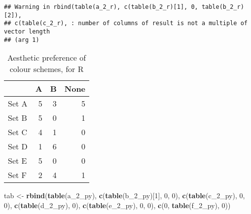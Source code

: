 \documentclass[
]{article}
\newenvironment{Shaded}{\begin{snugshade}}{\end{snugshade}}
\newcommand{\DataTypeTok}[1]{\textcolor[rgb]{0.13,0.29,0.53}{#1}}
\newcommand{\DecValTok}[1]{\textcolor[rgb]{0.00,0.00,0.81}{#1}}
\newcommand{\KeywordTok}[1]{\textcolor[rgb]{0.13,0.29,0.53}{\textbf{#1}}}
\newcommand{\NormalTok}[1]{#1}
\newcommand{\OperatorTok}[1]{\textcolor[rgb]{0.81,0.36,0.00}{\textbf{#1}}}
\newcommand{\StringTok}[1]{\textcolor[rgb]{0.31,0.60,0.02}{#1}}
\begin{document}
\begin{verbatim}
## Warning in rbind(table(a_2_r), c(table(b_2_r)[1], 0, table(b_2_r)[2]),
## c(table(c_2_r), : number of columns of result is not a multiple of vector length
## (arg 1)
\end{verbatim}

\begin{Shaded}
\end{Shaded}

\begin{table}[!h]

\caption{\label{tab:unnamed-chunk-52}Aesthetic preference of colour schemes, for R}
\centering
\begin{tabular}[t]{l|r|r|r}
\hline
  & A & B & None\\
\hline
Set A & 5 & 3 & 5\\
\hline
Set B & 5 & 0 & 1\\
\hline
Set C & 4 & 1 & 0\\
\hline
Set D & 1 & 6 & 0\\
\hline
Set E & 5 & 0 & 0\\
\hline
Set F & 2 & 4 & 1\\
\hline
\end{tabular}
\end{table}

\begin{Shaded}
\begin{Highlighting}[]
\NormalTok{tab <-}\StringTok{ }\KeywordTok{rbind}\NormalTok{(}\KeywordTok{table}\NormalTok{(a_}\DecValTok{2}\NormalTok{_py), }\KeywordTok{c}\NormalTok{(}\KeywordTok{table}\NormalTok{(b_}\DecValTok{2}\NormalTok{_py)[}\DecValTok{1}\NormalTok{], }\DecValTok{0}\NormalTok{, }\DecValTok{0}\NormalTok{), }\KeywordTok{c}\NormalTok{(}\KeywordTok{table}\NormalTok{(c_}\DecValTok{2}\NormalTok{_py), }\DecValTok{0}\NormalTok{, }\DecValTok{0}\NormalTok{), }\KeywordTok{c}\NormalTok{(}\KeywordTok{table}\NormalTok{(d_}\DecValTok{2}\NormalTok{_py), }\DecValTok{0}\NormalTok{), }\KeywordTok{c}\NormalTok{(}\KeywordTok{table}\NormalTok{(e_}\DecValTok{2}\NormalTok{_py), }\DecValTok{0}\NormalTok{, }\DecValTok{0}\NormalTok{), }\KeywordTok{c}\NormalTok{(}\DecValTok{0}\NormalTok{, }\KeywordTok{table}\NormalTok{(f_}\DecValTok{2}\NormalTok{_py), }\DecValTok{0}\NormalTok{))}
\end{Highlighting}
\end{Shaded}
\end{document}
